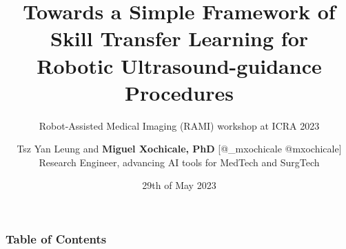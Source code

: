 \documentclass[xcolor={dvipsnames},aspectratio=169,10pt]{beamer}
\title{  
Towards a Simple Framework of Skill Transfer Learning for \\ Robotic Ultrasound-guidance Procedures
}
\subtitle{Robot-Assisted Medical Imaging (RAMI) workshop at ICRA 2023}
\author{
Tsz Yan Leung and
{\bf Miguel Xochicale, PhD} [\faTwitter @\_mxochicale  \faGithub @mxochicale] \\
Research Engineer, advancing AI tools for MedTech and SurgTech 
}
\date{
29th of May 2023
}
\institute{
Advanced Research Computing Centre and WEISS \\
University College London
}
\begin{document}
\maketitle

\begin{frame}
\frametitle{Table of Contents}
    \tableofcontents
\end{frame}


\maketitle


\end{document}
